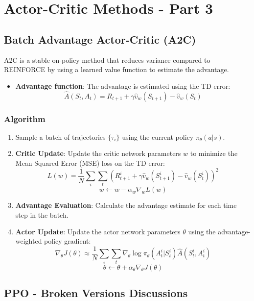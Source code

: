 \documentclass[12pt]{article}
\begin{document}
\section{Actor-Critic Methods - Part 3 }

\subsection{Batch Advantage Actor-Critic (A2C)}
A2C is a stable on-policy method that reduces variance compared to REINFORCE by using a learned value function to estimate the advantage.
\begin{itemize}
    \item \textbf{Advantage function}: The advantage is estimated using the TD-error:
    $$ \hat{A}(S_t, A_t) = R_{t+1} + \gamma \hat{v}_w(S_{t+1}) - \hat{v}_w(S_t) $$
\end{itemize}

\subsubsection{Algorithm}
\begin{enumerate}
    \item Sample a batch of trajectories $\{\tau_i\}$ using the current policy $\pi_\theta(a|s)$.
    \item \textbf{Critic Update}: Update the critic network parameters $w$ to minimize the Mean Squared Error (MSE) loss on the TD-error:
    $$ L(w) = \frac{1}{N} \sum_i \sum_t \left(R_{t+1}^i + \gamma \hat{v}_w(S_{t+1}^i) - \hat{v}_w(S_t^i)\right)^2 $$
    $$ w \leftarrow w - \alpha_w \nabla_w L(w) $$
    \item \textbf{Advantage Evaluation}: Calculate the advantage estimate for each time step in the batch.
    \item \textbf{Actor Update}: Update the actor network parameters $\theta$ using the advantage-weighted policy gradient:
    $$ \nabla_\theta J(\theta) \approx \frac{1}{N} \sum_i \sum_t \nabla_\theta \log \pi_\theta(A_t^i | S_t^i) \hat{A}(S_t^i, A_t^i) $$
    $$ \theta \leftarrow \theta + \alpha_\theta \nabla_\theta J(\theta) $$
\end{enumerate}

\subsection{PPO - Broken Versions Discussions}
\end{document}
